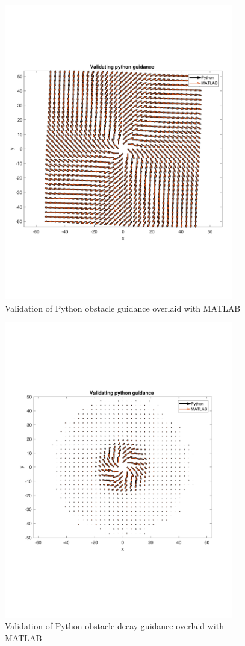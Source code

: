 \documentclass[numbered,pdftex]{ohio-etd}
\begin{document}
\begin{figure}
	\centering
	\includegraphics[trim=0 140 0 140,clip,width=10cm]{PaperFigures/Methods/resultsPython/obstacle}
	\caption{Validation of Python obstacle guidance overlaid with MATLAB}
	\label{fig:valPythonAvoidance}
\end{figure}

\begin{figure}[H]
	\centering
	\includegraphics[trim=0 140 0 140,clip,width=10cm]{PaperFigures/Methods/resultsPython/obstacleWithDecayAndCirculation}
	\caption{Validation of Python obstacle decay guidance overlaid with MATLAB}
	\label{fig:valPythonAvoidanceDecay}
\end{figure}
\end{document}
